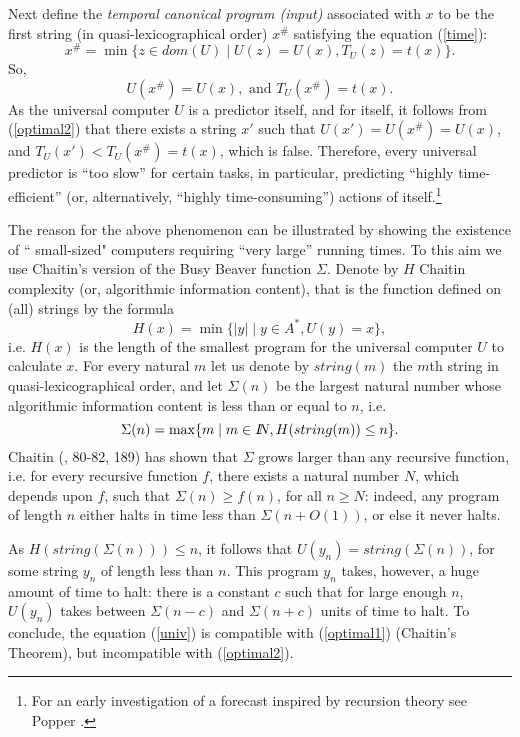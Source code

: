 Next define
the {\em temporal canonical program (input)}
associated with $x$ to be the first string (in quasi-lexicographical order)
$x^{\#}$  satisfying
the equation (\ref{time}):
\[x^{\#} = \min\{z \in dom(U)\;|\; U(z)=U(x), T_U(z)=t(x)\}.\]
So,
\[U(x^{\#}) = U(x), \mbox{  and  } T_U(x^{\#}) = t(x).\]
As the universal computer $U$  is a  predictor itself, and for itself, it
follows
from
(\ref{optimal2})
that there exists a string $x'$ such that $U(x')=U(x^{\#})=U(x)$, and
$T_U(x') < T_U(x^{\#}) = t(x)$,
which is false. Therefore, every
universal predictor is ``too slow'' for certain tasks, in particular,
predicting ``highly time-efficient'' (or, alternatively, ``highly
time-consuming'') actions of itself.\footnote{For an early
investigation of a  forecast inspired by recursion
theory  see Popper
\cite{popper}.}


The reason for the above phenomenon can be illustrated by
showing the existence of `` small-sized" computers requiring ``very large''
running times.
To this aim we  use
Chaitin's version of the Busy Beaver function
$\Sigma$. Denote
by $H$ Chaitin complexity (or, algorithmic information
content), that is  the function defined on (all) strings by the formula
\[H(x) = \min\{|y| \;|\; y \in A^*, U(y)=x\},\]
i.e. $H(x)$ is the length  of the smallest program for the universal
computer $U$
to calculate $x$.
For every natural
$m$ let us denote by $string(m)$ the $m$th string in quasi-lexicographical
order,
and let  $\Sigma (n)$
 be   the largest natural number whose algorithmic information
content is less than or equal to $n$, i.e.
\[\Sigma(n) = \max\{m \;|\; m \in I\!\!N,  H(string(m)) \leq n\}.\]
  Chaitin
(\cite{ch9},  80-82, 189)  has shown
that
  $\Sigma $
grows larger than any recursive function, i.e. for every recursive
function $f$, there exists a natural number $N$, which depends upon $f$,
such that $\Sigma(n) \geq f(n)$, for all $ n \geq N$: indeed, any program of
length $n$ either halts in time less than $\Sigma(n + O(1))$, or else
it never halts.

As $H(string(\Sigma(n))) \leq n$, it follows that $U(y_n)=string(\Sigma(n))$,
for some string $y_n$ of length less than $n$. This program  $y_n$ takes,
however, a huge amount of time to halt: there is a constant $c$ such that
for large enough $n$, $U(y_n)$ takes between $\Sigma(n-c)$ and $\Sigma(n+c)$
units of time
to halt. To conclude, the equation (\ref{univ})
 is compatible with   (\ref{optimal1})  (Chaitin's Theorem), but
incompatible with (\ref{optimal2}).




